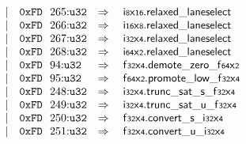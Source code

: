 $$\begin{array}[t]{@{}lrrl@{}l@{}l@{}l@{}}
& & | & \mathtt{0xFD}~~265{:}{\mathtt{u32}} & \quad\Rightarrow\quad{} & {\mathsf{i{\scriptstyle 8}}}{\mathsf{x}}{\mathsf{{\scriptstyle 16}}} {.} \mathsf{relaxed\_laneselect} \\
& & | & \mathtt{0xFD}~~266{:}{\mathtt{u32}} & \quad\Rightarrow\quad{} & {\mathsf{i{\scriptstyle 16}}}{\mathsf{x}}{\mathsf{{\scriptstyle 8}}} {.} \mathsf{relaxed\_laneselect} \\
& & | & \mathtt{0xFD}~~267{:}{\mathtt{u32}} & \quad\Rightarrow\quad{} & {\mathsf{i{\scriptstyle 32}}}{\mathsf{x}}{\mathsf{{\scriptstyle 4}}} {.} \mathsf{relaxed\_laneselect} \\
& & | & \mathtt{0xFD}~~268{:}{\mathtt{u32}} & \quad\Rightarrow\quad{} & {\mathsf{i{\scriptstyle 64}}}{\mathsf{x}}{\mathsf{{\scriptstyle 2}}} {.} \mathsf{relaxed\_laneselect} \\
& & | & \mathtt{0xFD}~~94{:}{\mathtt{u32}} & \quad\Rightarrow\quad{} & {\mathsf{f{\scriptstyle 32}}}{\mathsf{x}}{\mathsf{{\scriptstyle 4}}} {.} {{\mathsf{demote}}{\mathsf{\_}}{\mathsf{zero}}}{\mathsf{\_}}{{\mathsf{f{\scriptstyle 64}}}{\mathsf{x}}{\mathsf{{\scriptstyle 2}}}} \\
& & | & \mathtt{0xFD}~~95{:}{\mathtt{u32}} & \quad\Rightarrow\quad{} & {\mathsf{f{\scriptstyle 64}}}{\mathsf{x}}{\mathsf{{\scriptstyle 2}}} {.} {{\mathsf{promote}}{\mathsf{\_}}{\mathsf{low}}}{\mathsf{\_}}{{\mathsf{f{\scriptstyle 32}}}{\mathsf{x}}{\mathsf{{\scriptstyle 4}}}} \\
& & | & \mathtt{0xFD}~~248{:}{\mathtt{u32}} & \quad\Rightarrow\quad{} & {\mathsf{i{\scriptstyle 32}}}{\mathsf{x}}{\mathsf{{\scriptstyle 4}}} {.} {{\mathsf{trunc\_sat}}{\mathsf{\_}}{\mathsf{s}}}{\mathsf{\_}}{{\mathsf{f{\scriptstyle 32}}}{\mathsf{x}}{\mathsf{{\scriptstyle 4}}}} \\
& & | & \mathtt{0xFD}~~249{:}{\mathtt{u32}} & \quad\Rightarrow\quad{} & {\mathsf{i{\scriptstyle 32}}}{\mathsf{x}}{\mathsf{{\scriptstyle 4}}} {.} {{\mathsf{trunc\_sat}}{\mathsf{\_}}{\mathsf{u}}}{\mathsf{\_}}{{\mathsf{f{\scriptstyle 32}}}{\mathsf{x}}{\mathsf{{\scriptstyle 4}}}} \\
& & | & \mathtt{0xFD}~~250{:}{\mathtt{u32}} & \quad\Rightarrow\quad{} & {\mathsf{f{\scriptstyle 32}}}{\mathsf{x}}{\mathsf{{\scriptstyle 4}}} {.} {{\mathsf{convert}}{\mathsf{\_}}{\mathsf{s}}}{\mathsf{\_}}{{\mathsf{i{\scriptstyle 32}}}{\mathsf{x}}{\mathsf{{\scriptstyle 4}}}} \\
& & | & \mathtt{0xFD}~~251{:}{\mathtt{u32}} & \quad\Rightarrow\quad{} & {\mathsf{f{\scriptstyle 32}}}{\mathsf{x}}{\mathsf{{\scriptstyle 4}}} {.} {{\mathsf{convert}}{\mathsf{\_}}{\mathsf{u}}}{\mathsf{\_}}{{\mathsf{i{\scriptstyle 32}}}{\mathsf{x}}{\mathsf{{\scriptstyle 4}}}} \\

\end{array}$$
